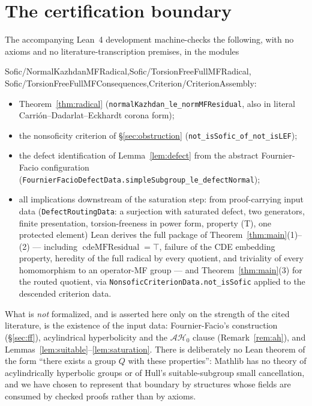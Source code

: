\documentclass[11pt]{amsart}
\theoremstyle{remark}
\theoremstyle{definition}
\begin{document}
\section{The certification boundary}\label{sec:boundary}

The accompanying Lean~4 development machine-checks the following, with no
axioms and no literature-transcription premises, in the modules
\begin{center}\ttfamily
Sofic/NormalKazhdanMFRadical,\quad Sofic/TorsionFreeFullMFRadical,\\
Sofic/TorsionFreeFullMFConsequences,\quad Criterion/CriterionAssembly:
\end{center}

\begin{itemize}
\item Theorem~\ref{thm:radical} (\texttt{normalKazhdan\_le\_normMFResidual},
  also in literal Carri\'on--Dadarlat--Eckhardt corona form);
\item the nonsoficity criterion of \S\ref{sec:obstruction}
  (\texttt{not\_isSofic\_of\_not\_isLEF});
\item the defect identification of Lemma~\ref{lem:defect} from the abstract
  Fournier-Facio configuration
  (\texttt{FournierFacioDefectData.simpleSubgroup\_le\_defectNormal});
\item all implications downstream of the saturation step: from
  proof-carrying input data (\texttt{DefectRoutingData}: a surjection with
  saturated defect, two generators, finite presentation, torsion-freeness in
  power form, property \textup{(T)}, one protected element) Lean derives the
  full package of Theorem~\ref{thm:main}(1)--(2) --- including
  $\operatorname{cdeMFResidual}=\top$, failure of the CDE embedding
  property, heredity of the full radical by every quotient, and triviality
  of every homomorphism to an operator-MF group --- and
  Theorem~\ref{thm:main}(3) for the routed quotient, via
  \texttt{NonsoficCriterionData.not\_isSofic} applied to the descended
  criterion data.
\end{itemize}

What is \emph{not} formalized, and is asserted here only on the strength of
the cited literature, is the existence of the input data:
Fournier-Facio's construction (\S\ref{sec:ff}), acylindrical hyperbolicity
and the $\mathcal{AH}_0$ clause (Remark~\ref{rem:ah}), and
Lemmas~\ref{lem:suitable}--\ref{lem:saturation}.  There is deliberately no
Lean theorem of the form ``there exists a group $Q$ with these properties'':
Mathlib has no theory of acylindrically hyperbolic groups or of Hull's
suitable-subgroup small cancellation, and we have chosen to represent that
boundary by structures whose fields are consumed by checked proofs rather
than by axioms.
\end{document}
